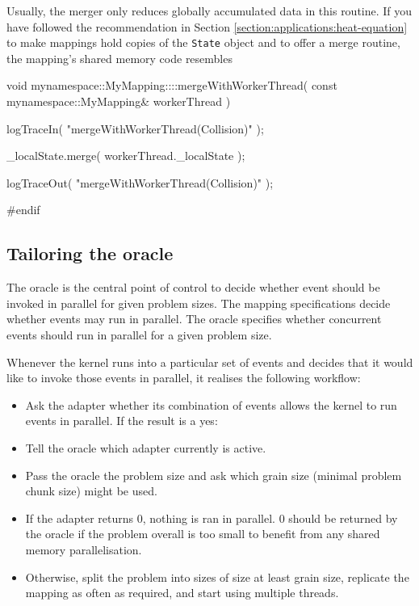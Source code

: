Usually, the merger only reduces globally accumulated data in this routine. 
If you have followed the recommendation in Section
\ref{section:applications:heat-equation} to make mappings hold copies of the
\texttt{State} object and to offer a merge routine, the mapping's shared
memory code resembles

\begin{code}
void mynamespace::MyMapping::::mergeWithWorkerThread(
  const mynamespace::MyMapping& workerThread
) {
  logTraceIn( "mergeWithWorkerThread(Collision)" );

  _localState.merge( workerThread._localState );
  
  logTraceOut( "mergeWithWorkerThread(Collision)" );
}
#endif

\end{code}


\subsection{Tailoring the oracle}

The oracle is the central point of control to decide whether event should be
invoked in parallel for given problem sizes.
The mapping specifications decide whether events may run in parallel.
The oracle specifies whether concurrent events should run in parallel for a
given problem size.


Whenever the kernel runs into a particular set of events and decides that it
would like to invoke those events in parallel, it realises the following
workflow:
\begin{itemize}
  \item Ask the adapter whether its combination of events allows the kernel to
  run events in parallel. If the result is a yes:
  \item Tell the oracle which adapter currently is active.
  \item Pass the oracle the problem size and ask which grain size (minimal
  problem chunk size) might be used. 
  \item If the adapter returns 0, nothing is ran in parallel. 0 should be
  returned by the oracle if the problem overall is too small to benefit from any
  shared memory parallelisation.
  \item Otherwise, split the problem into sizes of size at least grain size,
  replicate the mapping as often as required, and start using multiple threads.
\end{itemize}


